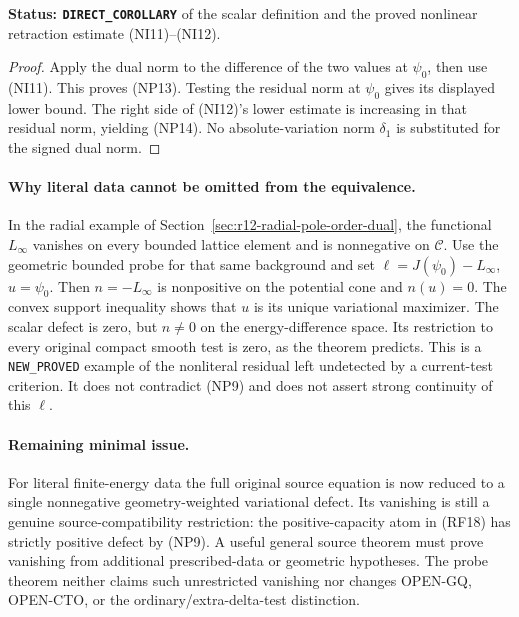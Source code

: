\noindent\textbf{Status: \texttt{DIRECT\_COROLLARY}}
of the scalar definition and the proved nonlinear
retraction estimate \textup{(NI11)--(NI12)}.

\begin{proof}
Apply the dual norm to the difference of the two
values at $\psi_0$, then use \textup{(NI11)}.
This proves \textup{(NP13)}.  Testing the residual
norm at $\psi_0$ gives its displayed lower bound.
The right side of \textup{(NI12)}'s lower estimate
is increasing in that residual norm, yielding
\textup{(NP14)}.  No absolute-variation norm
$\delta_1$ is substituted for the signed dual norm.
\end{proof}

\paragraph{Why literal data cannot be omitted from the equivalence.}
In the radial example of Section~\ref{sec:r12-radial-pole-order-dual},
the functional $L_\infty$ vanishes on every bounded
lattice element and is nonnegative on $\mathscr C$.
Use the geometric bounded probe for that same background
and set $\ell=J(\psi_0)-L_\infty$, $u=\psi_0$.
Then $n=-L_\infty$ is nonpositive on the potential
cone and $n(u)=0$.  The convex support inequality
shows that $u$ is its unique variational maximizer.
The scalar defect is zero, but $n\ne0$ on the
energy-difference space.  Its restriction to every
original compact smooth test is zero, as the theorem
predicts.  This is a \texttt{NEW\_PROVED} example
of the nonliteral residual left undetected by a
current-test criterion.  It does not contradict
\textup{(NP9)} and does not assert strong continuity
of this $\ell$.

\paragraph{Remaining minimal issue.}
For literal finite-energy data the full original source
equation is now reduced to a single nonnegative
geometry-weighted variational defect.  Its vanishing
is still a genuine source-compatibility restriction:
the positive-capacity atom in \textup{(RF18)} has
strictly positive defect by \textup{(NP9)}.  A useful
general source theorem must prove vanishing from
additional prescribed-data or geometric hypotheses.
The probe theorem neither claims such unrestricted
vanishing nor changes OPEN-GQ, OPEN-CTO, or the
ordinary/extra-delta-test distinction.
